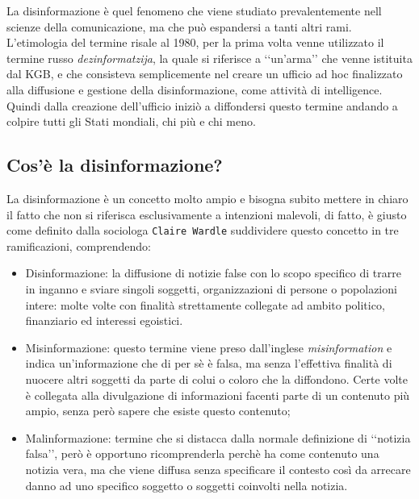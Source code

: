 \documentclass{article}
\begin{document}
\begin{justify}
    La disinformazione è quel fenomeno che viene studiato prevalentemente nell scienze della comunicazione, ma che può espandersi a tanti altri rami.
    L'etimologia del termine risale al 1980, per la prima volta venne utilizzato il termine russo \textit{dezinformatzija}, la quale si riferisce a ‘‘un'arma’’ che venne istituita dal KGB, e che consisteva semplicemente nel creare un ufficio ad hoc finalizzato alla diffusione e gestione della disinformazione, come attività di intelligence.\citep{DisWiki}\\
    Quindi dalla creazione dell'ufficio iniziò a diffondersi questo termine andando a colpire tutti gli Stati mondiali, chi più e chi meno.
\end{justify}

\centering\subsection{Cos'è la disinformazione?}

\begin{justify}
    La disinformazione è un concetto molto ampio e bisogna subito mettere in chiaro il fatto che non si riferisca esclusivamente a intenzioni malevoli, di fatto, è giusto come definito dalla sociologa \texttt{Claire Wardle} suddividere questo concetto in tre ramificazioni, comprendendo:
\begin{itemize}
    \item Disinformazione: la diffusione di notizie false con lo scopo specifico di trarre in inganno e sviare singoli soggetti, organizzazioni di persone o popolazioni intere: molte volte con finalità strettamente collegate ad ambito politico, finanziario ed interessi egoistici.
    \item Misinformazione: questo termine viene preso dall'inglese \textit{misinformation} e indica un'informazione che di per sè è falsa, ma senza l'effettiva finalità di nuocere altri soggetti da parte di colui o coloro che la diffondono. Certe volte è collegata alla divulgazione di informazioni facenti parte di un contenuto più ampio, senza però sapere che esiste questo contenuto;
    \item Malinformazione: termine che si distacca dalla normale definizione di ‘‘notizia falsa’’, però è opportuno ricomprenderla perchè ha come contenuto una notizia vera, ma che viene diffusa senza specificare il contesto così da arrecare danno ad uno specifico soggetto o soggetti coinvolti nella notizia. \citep{wardle2018information}
\end{itemize}
\end{justify}
\end{document}

